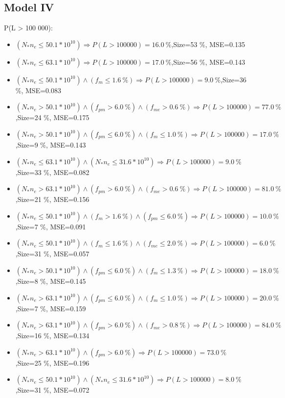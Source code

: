 \documentclass[numbered]{CSL}
\begin{document}
\subsection{Model IV}
P(L > 100 000):
\begin{itemize}
\item $(N_* n_e \leq 50.1 * 10^{10}) \Rightarrow P(L > 100 000) = 16.0~\%$,\hfill Size=53 \%, MSE=0.135
\item $(N_* n_e \leq 63.1 * 10^{10}) \Rightarrow P(L > 100 000) = 17.0~\%$,\hfill Size=56 \%, MSE=0.143
\item $(N_* n_e \leq 50.1 * 10^{10}) \land (f_m \leq 1.6~\%) \Rightarrow P(L > 100 000) = 9.0~\%$,\hfill Size=36 \%, MSE=0.083
\item $(N_* n_e > 50.1 * 10^{10}) \land (f_{pm} > 6.0~\%) \land (f_{me} > 0.6~\%) \Rightarrow P(L > 100 000) = 77.0~\%$,\hfill Size=24 \%, MSE=0.175
\item $(N_* n_e > 50.1 * 10^{10}) \land (f_{pm} \leq 6.0~\%) \land (f_m \leq 1.0~\%) \Rightarrow P(L > 100 000) = 17.0~\%$,\hfill Size=9 \%, MSE=0.143
\item $(N_* n_e \leq 63.1 * 10^{10}) \land (N_* n_e \leq 31.6 * 10^{10}) \Rightarrow P(L > 100 000) = 9.0~\%$,\hfill Size=33 \%, MSE=0.082
\item $(N_* n_e > 63.1 * 10^{10}) \land (f_{pm} > 6.0~\%) \land (f_{me} > 0.6~\%) \Rightarrow P(L > 100 000) = 81.0~\%$,\hfill Size=21 \%, MSE=0.156
\item $(N_* n_e \leq 50.1 * 10^{10}) \land (f_m > 1.6~\%) \land (f_{pm} \leq 6.0~\%) \Rightarrow P(L > 100 000) = 10.0~\%$,\hfill Size=7 \%, MSE=0.091
\item $(N_* n_e \leq 50.1 * 10^{10}) \land (f_m \leq 1.6~\%) \land (f_{me} \leq 2.0~\%) \Rightarrow P(L > 100 000) = 6.0~\%$,\hfill Size=31 \%, MSE=0.057
\item $(N_* n_e > 50.1 * 10^{10}) \land (f_{pm} \leq 6.0~\%) \land (f_m \leq 1.3~\%) \Rightarrow P(L > 100 000) = 18.0~\%$,\hfill Size=8 \%, MSE=0.145
\item $(N_* n_e > 63.1 * 10^{10}) \land (f_{pm} \leq 6.0~\%) \land (f_m \leq 1.0~\%) \Rightarrow P(L > 100 000) = 20.0~\%$,\hfill Size=7 \%, MSE=0.159
\item $(N_* n_e > 63.1 * 10^{10}) \land (f_{pm} > 6.0~\%) \land (f_{me} > 0.8~\%) \Rightarrow P(L > 100 000) = 84.0~\%$,\hfill Size=16 \%, MSE=0.134
\item $(N_* n_e > 63.1 * 10^{10}) \land (f_{pm} > 6.0~\%) \Rightarrow P(L > 100 000) = 73.0~\%$,\hfill Size=25 \%, MSE=0.196
\item $(N_* n_e \leq 50.1 * 10^{10}) \land (N_* n_e \leq 31.6 * 10^{10}) \Rightarrow P(L > 100 000) = 8.0~\%$,\hfill Size=31 \%, MSE=0.072

\end{itemize}
\end{document}
